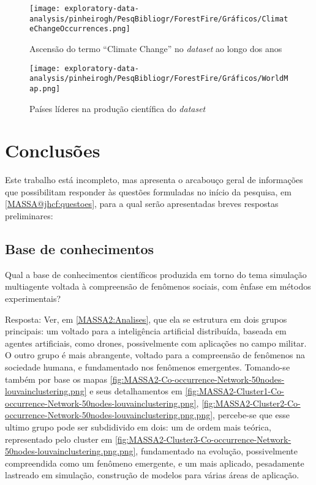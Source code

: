 \begin{figure}[H]
    \centering
    \texttt{[image: exploratory-data-analysis/pinheirogh/PesqBibliogr/ForestFire/Gráficos/ClimateChangeOccurrences.png]}
    \caption{Ascensão do termo ``Climate Change'' no \textit{dataset} ao longo dos anos}
    \label{fig:d}
\end{figure}

\begin{figure}[H]
    \centering
    \texttt{[image: exploratory-data-analysis/pinheirogh/PesqBibliogr/ForestFire/Gráficos/WorldMap.png]}
    \caption{Países líderes na produção científica do \textit{dataset}}
    \label{fig:e}
\end{figure}



\section{Conclusões}

Este trabalho está incompleto, mas apresenta o arcabouço geral de informações que possibilitam responder às  questões formuladas no início da pesquisa, em \ref{MASSA@jhcf:questoes}, para a qual serão apresentadas breves respostas preliminares:

\subsection{Base de conhecimentos}

Qual a base de conhecimentos científicos produzida em torno do tema simulação multiagente voltada à compreensão de fenômenos sociais, com ênfase em métodos experimentais?
 
Resposta: Ver, em \ref{MASSA2:Analises}, que ela se estrutura em dois grupos principais: um voltado para a inteligência artificial distribuída, baseada em agentes artificiais, como drones, possivelmente com aplicações no campo militar.
O outro grupo é mais abrangente, voltado para a compreensão de fenômenos na sociedade humana, e fundamentado
nos fenômenos emergentes.
Tomando-se também por base os mapas \ref{fig:MASSA2-Co-occurrence-Network-50nodes-louvainclustering.png} e seus detalhamentos em \ref{fig:MASSA2-Cluster1-Co-occurrence-Network-50nodes-louvainclustering.png}, \ref{fig:MASSA2-Cluster2-Co-occurrence-Network-50nodes-louvainclustering.png.png}, percebe-se que esse ultimo grupo pode ser subdidivido em dois: um de ordem mais teórica, representado pelo cluster em \ref{fig:MASSA2-Cluster3-Co-occurrence-Network-50nodes-louvainclustering.png.png}, fundamentado na evolução, possivelmente compreendida como um fenômeno emergente, e um mais aplicado, pesadamente lastreado em simulação, construção de modelos para várias áreas de aplicação.

